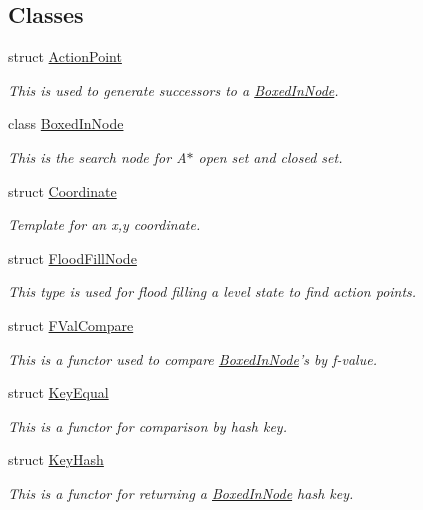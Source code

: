 \subsection*{Classes}
\begin{DoxyCompactItemize}
\item 
struct \hyperlink{structboxedin_1_1ActionPoint}{Action\+Point}
\begin{DoxyCompactList}\small\item\em This is used to generate successors to a \hyperlink{classboxedin_1_1BoxedInNode}{Boxed\+In\+Node}. \end{DoxyCompactList}\item 
class \hyperlink{classboxedin_1_1BoxedInNode}{Boxed\+In\+Node}
\begin{DoxyCompactList}\small\item\em This is the search node for A$\ast$ open set and closed set. \end{DoxyCompactList}\item 
struct \hyperlink{structboxedin_1_1Coordinate}{Coordinate}
\begin{DoxyCompactList}\small\item\em Template for an x,y coordinate. \end{DoxyCompactList}\item 
struct \hyperlink{structboxedin_1_1FloodFillNode}{Flood\+Fill\+Node}
\begin{DoxyCompactList}\small\item\em This type is used for flood filling a level state to find action points. \end{DoxyCompactList}\item 
struct \hyperlink{structboxedin_1_1FValCompare}{F\+Val\+Compare}
\begin{DoxyCompactList}\small\item\em This is a functor used to compare \hyperlink{classboxedin_1_1BoxedInNode}{Boxed\+In\+Node}'s by f-\/value. \end{DoxyCompactList}\item 
struct \hyperlink{structboxedin_1_1KeyEqual}{Key\+Equal}
\begin{DoxyCompactList}\small\item\em This is a functor for comparison by hash key. \end{DoxyCompactList}\item 
struct \hyperlink{structboxedin_1_1KeyHash}{Key\+Hash}
\begin{DoxyCompactList}\small\item\em This is a functor for returning a \hyperlink{classboxedin_1_1BoxedInNode}{Boxed\+In\+Node} hash key. \end{DoxyCompactList}\item 

\end{DoxyCompactItemize}
